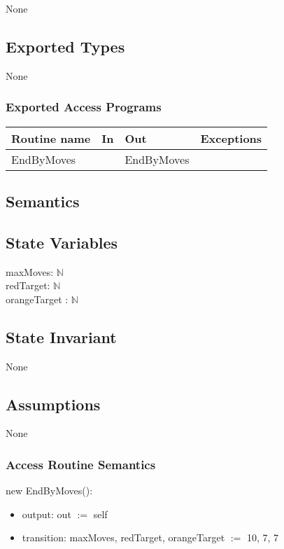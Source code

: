 \documentclass[12pt]{article}
\begin{document}
None

\subsection*{Exported Types}

None

\subsubsection* {Exported Access Programs}

\begin{tabular}{| l | l | l | p{6cm} |}
\hline
\textbf{Routine name} & \textbf{In} & \textbf{Out} & \textbf{Exceptions}\\
\hline
EndByMoves & ~ & EndByMoves & \\
\hline
\end{tabular}

\subsection* {Semantics}

\subsection*{State Variables}

maxMoves: $\mathbb{N}$ \\
redTarget: $\mathbb{N}$ \\
orangeTarget : $\mathbb{N}$ 

\subsection*{State Invariant}

None

\subsection*{Assumptions}

None

\subsubsection* {Access Routine Semantics}

new EndByMoves():

\begin{itemize}
  \item output: out $:=$ self
  \item transition: maxMoves, redTarget, orangeTarget $:=$ 10, 7, 7
\end{itemize}
\end{document}
